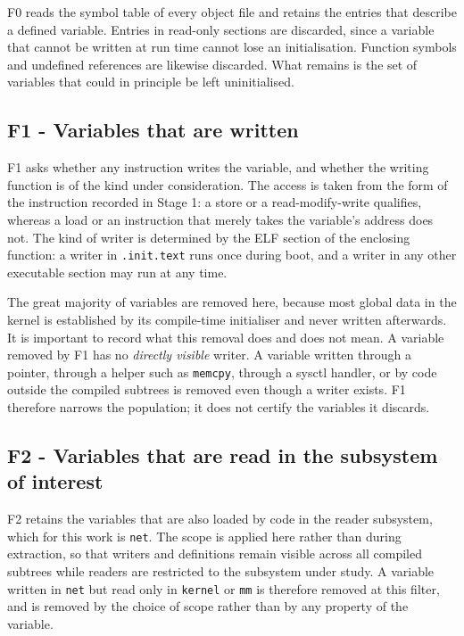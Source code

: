 \documentclass[12pt, a4paper, oneside]{book}
\begin{document}
F0 reads the symbol table of every object file and retains the entries that
describe a defined variable. Entries in read-only sections are discarded, since
a variable that cannot be written at run time cannot lose an initialisation.
Function symbols and undefined references are likewise discarded. What remains is
the set of variables that could in principle be left uninitialised.

\subsection{F1 - Variables that are written}

F1 asks whether any instruction writes the variable, and whether the writing
function is of the kind under consideration. The access is taken from the form of
the instruction recorded in Stage 1: a store or a read-modify-write qualifies,
whereas a load or an instruction that merely takes the variable's address does
not. The kind of writer is determined by the ELF section of the enclosing
function: a writer in \texttt{.init.text} runs once during boot, and a writer in
any other executable section may run at any time.

The great majority of variables are removed here, because most global data in the
kernel is established by its compile-time initialiser and never written
afterwards. It is important to record what this removal does and does not mean. A
variable removed by F1 has no \emph{directly visible} writer. A variable written
through a pointer, through a helper such as \texttt{memcpy}, through a sysctl
handler, or by code outside the compiled subtrees is removed even though a writer
exists. F1 therefore narrows the population; it does not certify the variables it
discards.

\subsection{F2 - Variables that are read in the subsystem of interest}

F2 retains the variables that are also loaded by code in the reader subsystem,
which for this work is \texttt{net}. The scope is applied here rather than during
extraction, so that writers and definitions remain visible across all compiled
subtrees while readers are restricted to the subsystem under study. A variable
written in \texttt{net} but read only in \texttt{kernel} or \texttt{mm} is
therefore removed at this filter, and is removed by the choice of scope rather
than by any property of the variable.
\end{document}
